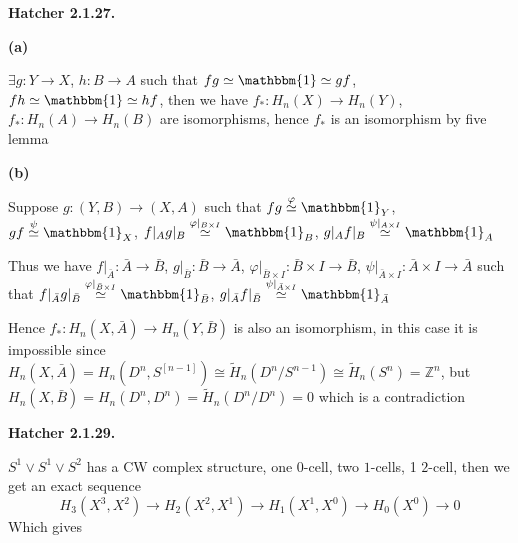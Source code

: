 \documentclass[12pt]{article}
\begin{document}
\textbf{Hatcher 2.1.27.} \par
\textbf{(a)} \par
$\exists g:Y\rightarrow X$, $h:B\rightarrow A$ such that $fg\simeq\mathbbm{1}\simeq gf$, $fh\simeq\mathbbm{1}\simeq hf$, then we have $f_*:H_n(X)\rightarrow H_n(Y)$, $f_*:H_n(A)\rightarrow H_n(B)$ are isomorphisms, hence $f_*$ is an isomorphism  by five lemma\par
\begin{center}
\end{center}
\textbf{(b)} \par
Suppose $g:(Y,B)\rightarrow (X,A)$ such that $fg\overset{\varphi}{\simeq}\mathbbm{1}_Y$, $gf\overset{\psi}{\simeq}\mathbbm{1}_X$, $f|_Ag|_B\overset{\varphi|_{B\times I}}{\simeq}\mathbbm{1}_B$, $g|_Af|_B\overset{\psi|_{A\times I}}{\simeq}\mathbbm{1}_A$ \par
Thus we have $f|_{\bar{A}}:\bar{A}\rightarrow\bar{B}$, $g|_{\bar{B}}:\bar{B}\rightarrow\bar{A}$, $\varphi|_{\bar{B}\times I}:\bar{B}\times I\rightarrow\bar{B}$, $\psi|_{\bar{A}\times I}:\bar{A}\times I\rightarrow\bar{A}$ such that $f|_{\bar{A}}g|_{\bar{B}}\overset{\varphi|_{\bar{B}\times I}}{\simeq}\mathbbm{1}_{\bar{B}}$, $g|_{\bar{A}}f|_{\bar{B}}\overset{\psi|_{\bar{A}\times I}}{\simeq}\mathbbm{1}_{\bar{A}}$  \par
Hence $f_*:H_n(X,\bar{A})\rightarrow H_n(Y,\bar{B})$ is also an isomorphism, in this case it is impossible since $H_n(X,\bar{A})=H_n(D^n,S^[n-1])\cong\tilde{H}_n(D^n/S^{n-1})\cong\tilde{H}_n(S^n)=\mathbb{Z}^n$, but $H_n(X,\bar{B})=H_n(D^n,D^n)=\tilde{H}_n(D^n/D^n)=0$ which is a contradiction \par
\textbf{Hatcher 2.1.29.} \par
$S^1\vee S^1\vee S^2$ has a CW complex structure, one $0$-cell, two $1$-cells, 1 $2$-cell, then we get an exact sequence
\[H_3(X^3,X^2)\rightarrow H_2(X^2,X^1)\rightarrow H_1(X^1,X^0)\rightarrow H_0(X^0)\rightarrow 0\]
Which gives  \par
\end{document}
